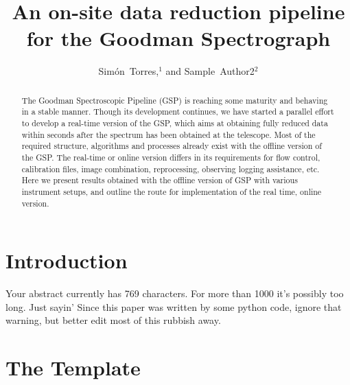 \documentclass[11pt,twoside]{article}
\begin{document}
\title{An on-site data reduction pipeline for the Goodman Spectrograph}


\author{Simón~Torres,$^1$ and Sample~Author2$^2$
  }           %



  
\begin{abstract}

The Goodman Spectroscopic Pipeline (GSP) is reaching some maturity and
behaving in a stable manner. Though its development continues, we have
started a parallel effort to develop a real-time version of the GSP,
which aims at obtaining fully reduced data within seconds after the spectrum
has been obtained at the telescope.  Most of the required structure, algorithms and
processes already exist with the offline version of the GSP. The real-time or online
version differs in its requirements for flow control, calibration files, image combination, reprocessing, observing logging assistance, etc.
Here we present results obtained with the offline version of GSP with various instrument setups, and outline the route for implementation of the real time, online version.
  
\end{abstract}

\section{Introduction}

Your abstract currently has 769 characters. For more than 1000 it's possibly too long. Just sayin'
Since this paper was written by some python code, ignore that warning, but better edit most of this rubbish away.


\section{The Template}
\end{document}
